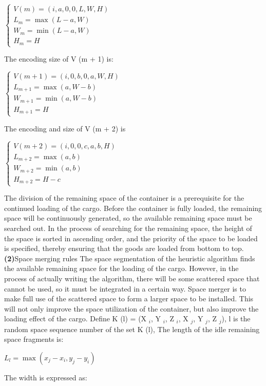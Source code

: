 \documentclass{article} %
\begin{document}
\centerline{$\left\{\begin{array}{l}{V(m)=(i, a, 0,0, L, W, H)} \\ {L_{m}=\max (L-a, W)} \\ {W_{m}=\min (L-a, W)} \\ {H_{m}=H}\end{array}\right.$}

The encoding size of V (m + 1) is:

\centerline{$\left\{\begin{array}{l}{V(m+1)=(i, 0, b, 0, a, W, H)} \\ {L_{m+1}=\max (a, W-b)} \\ {W_{m+1}=\min (a, W-b)} \\ {H_{m+1}=H}\end{array}\right.$}

The encoding and size of V (m + 2) is

\centerline{$\left\{\begin{array}{l}{V(m+2)=(i, 0,0, c, a, b, H)} \\ {L_{m+2}=\max (a, b)} \\ {W_{m+2}=\min (a, b)} \\ {H_{m+2}=H-c}\end{array}\right.$}


     The division of the remaining space of the container is a prerequisite for the continued loading of the cargo. Before the container is fully loaded, the remaining space will be continuously generated, so the available remaining space must be searched out.
In the process of searching for the remaining space, the height of the space is sorted in ascending order, and the priority of the space to be loaded is specified, thereby ensuring that the goods are loaded from bottom to top.
\textbf{(2)}Space merging rules
The space segmentation of the heuristic algorithm finds the available remaining space for the loading of the cargo.
However, in the process of actually writing the algorithm, there will be some scattered space that cannot be used, so it must be integrated in a certain way.
Space merger is to make full use of the scattered space to form a larger space to be installed.
This will not only improve the space utilization of the container, but also improve the loading effect of the cargo.
Define K (l) = (X $ _i $, Y $ _i $, Z $ _i $, X $ _j $, Y $ _j $, Z $ _j $), l is the random space sequence number of the set K (l), The length of the idle remaining space fragments is:

\centerline{$L_{l}=\max \left(x_{j}-x_{i}, y_{j}-y_{i}\right)$}
The width is expressed as:
\end{document}
